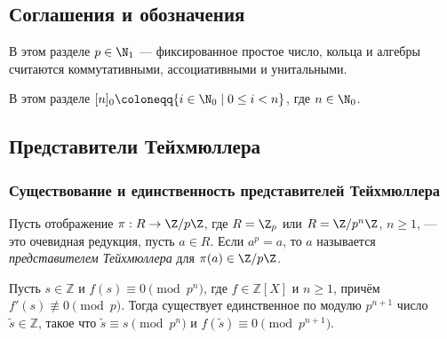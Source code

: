 \documentclass[
	extrafontsizes,
	11pt,
	hyphens,
]{memoir}
\begin{document}
\subsection{Соглашения и обозначения}

\begin{convention}
В этом разделе \(p \in \N_1\) --- фиксированное простое число, кольца и алгебры считаются коммутативными, ассоциативными и унитальными.
\end{convention}


\begin{notation}
В этом разделе
\([n]_0 \coloneqq \{i \in \N_0 \mid 0 \leq i < n\}\),
где \(n \in \N_0\).
\end{notation}


\subsection{Представители Тейхмюллера}

\subsubsection{Существование и единственность представителей Тейхмюллера}

\begin{definition}
Пусть отображение \(\pi : R \to \Z/p\Z\), где \(R = \Z_p\) или \(R = \Z/p^n\Z\), \(n \geq 1\), --- это очевидная редукция, пусть \(a \in R\). Если \(a^p = a\), то \(a\) называется \emph{представителем Тейхмюллера} для \(\pi(a) \in \Z/p\Z\).
\end{definition}

\begin{lemma}
Пусть \(s \in \mathbb{Z}\) и
\(f(s) \equiv 0 \pmod {p^n}\),
где \(f \in \mathbb{Z}[X]\) и \(n \geq 1\), причём \(f'(s) \not\equiv 0 \pmod p\). Тогда существует единственное по модулю \(p^{n+1}\) число \(\tilde{s} \in \mathbb{Z}\), такое что \(\tilde{s} \equiv s \pmod {p^n}\) и \(f(\tilde{s}) \equiv 0 \pmod {p^{n+1}}\).
\end{lemma}
\end{document}
